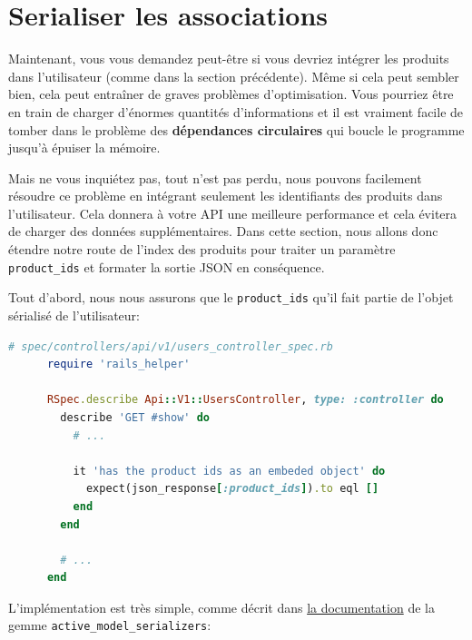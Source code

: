 \documentclass[]{report}
\begin{document}
  \section{Serialiser les associations}

    Maintenant, vous vous demandez peut-être si vous devriez intégrer les produits dans l'utilisateur (comme dans la section précédente). Même si cela peut sembler bien, cela peut entraîner de graves problèmes d'optimisation. Vous pourriez être en train de charger d'énormes quantités d'informations et il est vraiment facile de tomber dans le problème des \textbf{dépendances circulaires} qui boucle le programme jusqu'à épuiser la mémoire.

    Mais ne vous inquiétez pas, tout n'est pas perdu, nous pouvons facilement résoudre ce problème en intégrant seulement les identifiants des produits dans l'utilisateur. Cela donnera à votre API une meilleure performance et cela évitera de charger des données supplémentaires. Dans cette section, nous allons donc étendre notre route de l'index des produits pour traiter un paramètre \verb|product_ids| et formater la sortie JSON en conséquence.

    Tout d'abord, nous nous assurons que le \verb|product_ids| qu'il fait partie de l'objet sérialisé de l'utilisateur:

    \begin{scriptsize}
      \begin{lstlisting}[language=ruby, caption={Test de présence des identifiants des produits dans l'objet de l'utilisateur}, label={lst:product_ids_users_controller_spec}]
      # spec/controllers/api/v1/users_controller_spec.rb
      require 'rails_helper'

      RSpec.describe Api::V1::UsersController, type: :controller do
        describe 'GET #show' do
          # ...

          it 'has the product ids as an embeded object' do
            expect(json_response[:product_ids]).to eql []
          end
        end

        # ...
      end
      \end{lstlisting}
    \end{scriptsize}

    L'implémentation est très simple, comme décrit dans \href{https://github.com/rails-api/active_model_serializers/blob/0-10-stable/docs/howto/add_relationship_links.md#links-as-an-attribute-of-a-resource}{la documentation} de la gemme \verb|active_model_serializers|:
\end{document}
